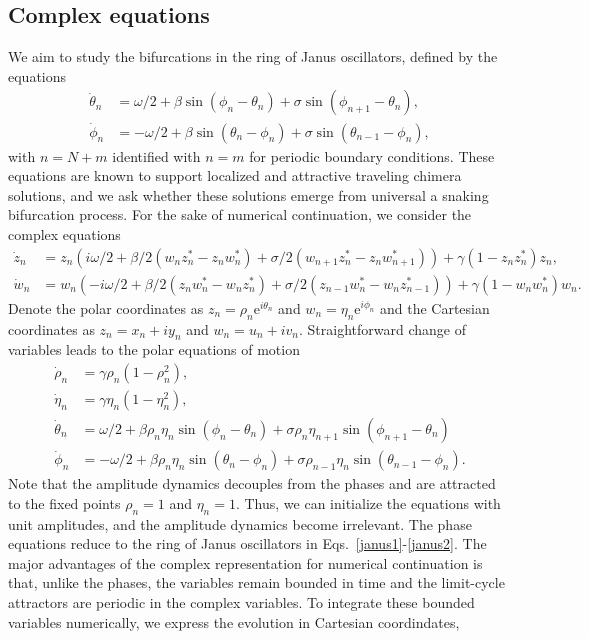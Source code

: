 \documentclass[aps,pre,amsmath,amssymb,floatfix,onecolumn,notitlepage,10pt]{revtex4-1}
\begin{document}
\subsection{Complex equations}
We aim to study the bifurcations in the ring of Janus oscillators, defined by the equations
\begin{align}
\dot{\theta}_n &= \omega/2 + \beta\sin(\phi_n - \theta_n) + \sigma \sin(\phi_{n+1}-\theta_n), \label{janus1}\\
\dot{\phi}_n &= -\omega/2 + \beta\sin(\theta_n - \phi_n) + \sigma \sin(\theta_{n-1}-\phi_n), \label{janus2}
\end{align}
with $n=N+m$ identified with $n=m$ for periodic boundary conditions. These equations are known to support localized and attractive traveling chimera solutions, and we ask whether these solutions emerge from universal a snaking bifurcation process.
For the sake of numerical continuation, we consider the complex equations
\begin{align}
\dot z_n &= z_n\left( i\omega/2 + \beta/2\left(w_nz_n^*-z_nw_n^*\right) + \sigma/2\left(w_{n+1}z_n^*-z_nw_{n+1}^*\right)\right) + \gamma\left(1-z_nz_n^*\right)z_n, \label{eom1} \\
\dot w_n &= w_n\left( -i\omega/2 + \beta/2\left(z_nw_n^*-w_nz_n^*\right) + \sigma/2\left(z_{n-1}w_n^*-w_nz_{n-1}^*\right)\right) + \gamma\left(1-w_nw_n^*\right)w_n. \label{eom2}
\end{align}
Denote the polar coordinates as $z_n = \rho_n{\mathrm e}^{i\theta_n}$ and $w_n = \eta_n{\mathrm e}^{i\phi_n}$ and the Cartesian coordinates as $z_n = x_n + iy_n$ and $w_n = u_n+iv_n$. Straightforward change of variables leads to the polar equations of motion
\begin{align}
\dot \rho_n &= \gamma \rho_n \left(1-\rho_n^2\right), \\
\dot \eta_n &=  \gamma \eta_n \left(1-\eta_n^2\right),  \\
\dot \theta_n &= \omega/2 + \beta \rho_n \eta_n \sin\left(\phi_n-\theta_n\right) + \sigma \rho_n\eta_{n+1}\sin\left(\phi_{n+1}-\theta_n\right)\\
\dot \phi_n &= -\omega/2 + \beta \rho_n \eta_n \sin\left(\theta_n-\phi_n\right) + \sigma \rho_{n-1} \eta_n\sin\left(\theta_{n-1}-\phi_n\right).
\end{align}
Note that the amplitude dynamics decouples from the phases and are attracted to the fixed points $\rho_n=1$ and $\eta_n=1$.  Thus, we can initialize the equations with unit amplitudes, and the amplitude dynamics become irrelevant.  The phase equations reduce to the ring of Janus oscillators in Eqs.~\eqref{janus1}-\eqref{janus2}. The major advantages of the complex representation for numerical continuation is that, unlike the phases, the variables remain bounded in time and the limit-cycle attractors are periodic in the complex variables.  To integrate these bounded variables numerically, we express the evolution in Cartesian coordindates,
\end{document}
